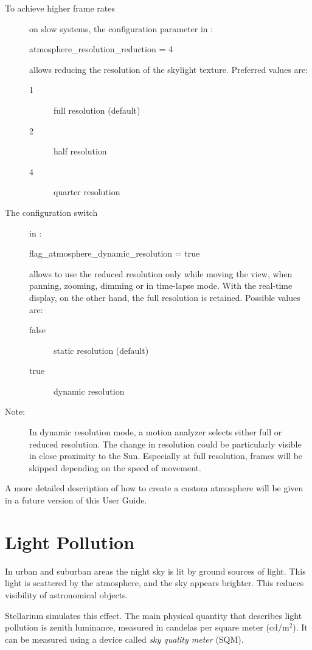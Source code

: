 \begin{description}
\item[To achieve higher frame rates] on slow systems,
the configuration parameter in :
\begin{configfile}
[landscape]
atmosphere_resolution_reduction = 4
\end{configfile}
allows reducing the resolution of the skylight texture.
Preferred values are:
\begin{description}
\item[1] full resolution (default)
\item[2] half resolution
\item[4] quarter resolution
\end{description}
\item[The configuration switch] in :
\begin{configfile}
[landscape]
flag_atmosphere_dynamic_resolution = true
\end{configfile}
allows to use the reduced resolution only while moving the view, when panning, 
zooming, dimming or in time-lapse mode. With the real-time display, on the other hand, 
the full resolution is retained.
Possible values are:
\begin{description}
\item[false] static resolution (default)
\item[true] dynamic resolution
\end{description}
\item[Note:]
In dynamic resolution mode, a motion analyzer selects either full or reduced resolution.
The change in resolution could be particularly visible in close proximity to the Sun.
Especially at full resolution, frames will be skipped depending on the speed of movement.
\end{description}

\noindent A more detailed description of how to create a custom atmosphere will
be given in a future version of this User Guide.

\section{Light Pollution}

In urban and suburban areas the night sky is lit by ground sources of light.
This light is scattered by the atmosphere, and the sky appears brighter. This
reduces visibility of astronomical objects.

Stellarium simulates this effect. The main physical quantity that describes light pollution is zenith luminance, measured in candelas per square meter ($\mathrm{cd/m^2}$). It can be measured using a device called \emph{sky quality meter} (SQM).

